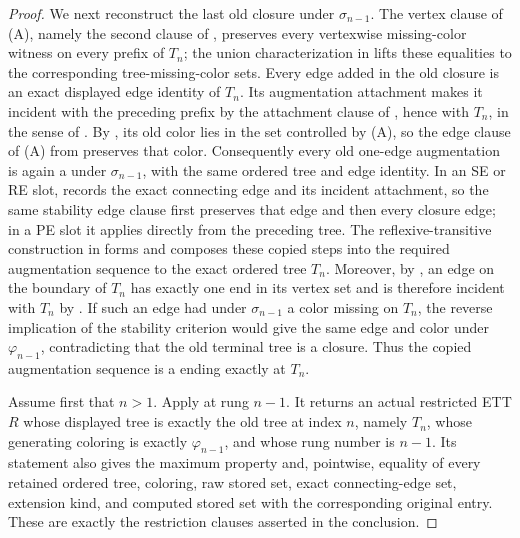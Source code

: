 \begin{proof}
We next reconstruct the last old closure under \(\sigma_{n-1}\).  The
vertex clause of (A), namely the second clause of
, preserves every vertexwise missing-color witness
on every prefix of \(T_n\); the union characterization in
 lifts these equalities to the corresponding
tree-missing-color sets.  Every edge added in the old closure is an exact
displayed edge identity of \(T_n\).  Its augmentation attachment makes it
incident with the preceding prefix by the attachment clause of
, hence with \(T_n\), in the sense of
.  By , its old
color lies in the set controlled by (A), so the edge clause of (A) from
 preserves that color.  Consequently every old
one-edge augmentation is again a  under
\(\sigma_{n-1}\), with the same ordered tree and edge identity.  In an SE
or RE slot,  records the exact connecting
edge and its incident attachment, so the same stability edge clause first
preserves that edge and then every closure edge; in a PE slot it applies
directly from the preceding tree.  The reflexive-transitive construction
in  forms and composes these copied
steps into the required augmentation sequence to the exact ordered tree
\(T_n\).  Moreover, by , an edge on the boundary of
\(T_n\) has exactly one end in its vertex set and is therefore incident
with \(T_n\) by .  If such an edge had under
\(\sigma_{n-1}\) a color missing on \(T_n\), the reverse implication of
the stability criterion  would give the same edge and color
under \(\varphi_{n-1}\), contradicting that the old terminal tree is a
closure.  Thus the copied augmentation sequence is a
 ending exactly at \(T_n\).

Assume first that \(n>1\).  Apply  at
rung \(n-1\).  It returns an actual restricted ETT \(R\) whose displayed
tree is exactly the old tree at index \(n\), namely \(T_n\), whose
generating coloring is exactly \(\varphi_{n-1}\), and whose rung number is
\(n-1\).  Its statement also gives the maximum property and, pointwise,
equality of every retained ordered tree, coloring, raw stored set, exact
connecting-edge set, extension kind, and computed stored set with the
corresponding original entry.  These are exactly the restriction clauses
asserted in the conclusion.


\end{proof}
